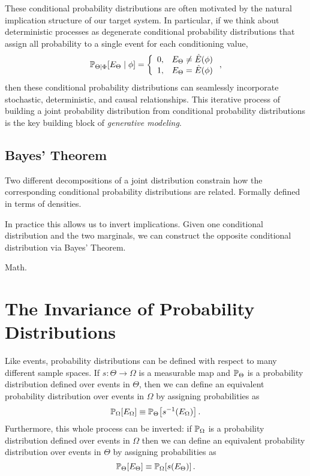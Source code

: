 These conditional probability distributions are often motivated by the natural 
implication structure of our target system.  In particular, if we think about 
deterministic processes as degenerate conditional probability distributions 
that assign all probability to a single event for each conditioning value,
%
\begin{equation*}
\mathbb{P}_{\Theta \mid \Phi} \! \left[ E_{\Theta} \mid \phi \right]
= 
\left\{
\begin{array}{rr}
0, & E_{\Theta} \ne \hat{E} \! \left( \phi \right) \\
1, & E_{\Theta} = \hat{E} \! \left( \phi \right)
\end{array}
\right.,
\end{equation*}
%
then these conditional probability distributions can seamlessly incorporate
stochastic, deterministic, and causal relationships.  This iterative process of 
building a joint probability distribution from conditional probability distributions 
is the key building block of \emph{generative modeling}.

\subsection{Bayes' Theorem}

Two different decompositions of a joint distribution constrain how the
corresponding conditional probability distributions are related.  Formally
defined in terms of densities.

In practice this allows us to invert implications.  Given one conditional
distribution and the two marginals, we can construct the opposite
conditional distribution via Bayes' Theorem.

Math.

\section{The Invariance of Probability Distributions}

Like events, probability distributions can be defined with respect to many different 
sample spaces.  If $s : \Theta \rightarrow \Omega$ is a measurable map and 
$\mathbb{P}_{\Theta}$ is a probability distribution defined over events in $\Theta$, then 
we can define an equivalent probability distribution over events in $\Omega$ by 
assigning probabilities as
%
\begin{equation*}
\mathbb{P}_{\Omega} \! \left[ E_{\Omega} \right]
\equiv
\mathbb{P}_{\Theta} \! \left[ s^{-1} \! \left( E_{\Omega} \right) \right].
\end{equation*}
%
Furthermore, this whole process can be inverted: if $\mathbb{P}_{\Omega}$ is a probability 
distribution defined over events in $\Omega$ then we can define an equivalent 
probability distribution over events in $\Theta$ by assigning probabilities as
%
\begin{equation*}
\mathbb{P}_{\Theta} \! \left[ E_{\Theta} \right]
\equiv
\mathbb{P}_{\Omega} \! \left[ s \! \left( E_{\Theta} \right) \right].
\end{equation*}

